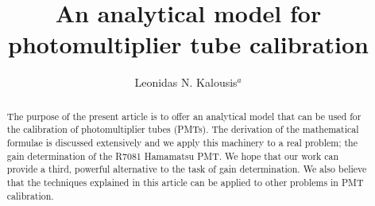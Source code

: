 \documentclass[preprint,12pt]{elsarticle}
\begin{document}
\begin{frontmatter}



\title{An analytical model for photomultiplier tube calibration}


\author{Leonidas N. Kalousis$^a$}


\begin{abstract}

The purpose of the present article is to offer an analytical model that can be used for the calibration of photomultiplier tubes (PMTs). 
The derivation of the mathematical formulae is discussed extensively and we apply this machinery to a real problem; the gain determination of the R7081 Hamamatsu PMT. 
We hope that our work can provide a third, powerful alternative to the task of gain determination.  
We also believe that the techniques explained in this article can be applied to other problems in PMT calibration. %
 

\end{abstract}
\end{frontmatter}
\end{document}

